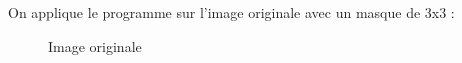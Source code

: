 \documentclass[french,a4paper,10pt]{article}
\begin{document}
    On applique le programme sur l'image originale avec un masque de 3x3 : %
    \begin{figure}[!htb]
        \begin{minipage}{0.48\textwidth}
            \centering
            \caption{Image originale}\label{Fig:peppers-grey-2}
        \end{minipage}\hfill
        \begin{minipage}{0.48\textwidth}
            \centering

\end{minipage}
\end{figure}
\end{document}
